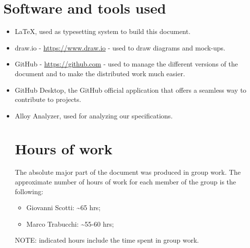 \section{Software and tools used}
\begin{itemize}
    \item \LaTeX, used as typesetting system to build this document.
    \item draw.io - \url{https://www.draw.io} - used to draw diagrams and mock-ups.
    \item GitHub - \url{https://github.com} - used to manage the different versions of the document and to make the distributed work much easier.
    \item GitHub Desktop, the GitHub official application that offers a seamless way to contribute to projects.
    \item Alloy Analyzer, used for analyzing our specifications.

\section{Hours of work}
The absolute major part of the document was produced in group work. The approximate number of hours of work for each member of the group is the following:

\begin{itemize}
\item Giovanni Scotti: \textasciitilde 65 hrs;
\item Marco Trabucchi: \textasciitilde 55-60 hrs;
\end{itemize}

NOTE: indicated hours include the time spent in group work.

\end{itemize}

